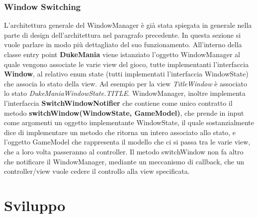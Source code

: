 \documentclass[a4paper,12pt]{report}
\begin{document}
\subsection{Window Switching}
L'architettura generale del WindowManager è già stata spiegata in generale nella parte di design dell'architettura nel paragrafo precedente.
In questa sezione si vuole parlare in modo più dettagliato del suo funzionamento.
All'interno della classe entry point \textbf{DukeMania} viene istanziato l'oggetto WindowManager al quale vengono associate le varie view del gioco, tutte implementanti l'interfaccia \textbf{Window},
al relativo enum state (tutti implementati l'interfaccia WindowState) che associa lo stato della view. Ad esempio per la view \emph{TitleWindow} è associato lo stato \emph{DukeManiaWindowState.TITLE}.
WindowManager, inoltre implementa l'interfaccia \textbf{SwitchWindowNotifier} che contiene come unico contratto il metodo \textbf{switchWindow(WindowState, GameModel)}, che prende in input come 
argomenti un oggetto implementante WindowState, il quale sostanzialmente dice di implementare un metodo che ritorna un intero associato allo stato, e l'oggetto GameModel che rappresenta il
modello che ci si passa tra le varie view, che a loro volta passeranno al controller.
Il metodo switchWindow non fa altro che notificare il WindowManager, mediante un meccanismo di callback, che un controller/view vuole cedere il controllo alla view specificata.
\newpage



\chapter{Sviluppo}
\end{document}

